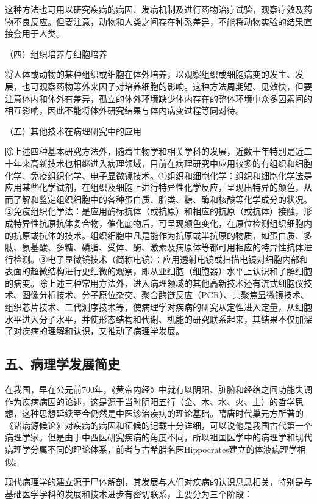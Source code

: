 这种方法也可用以研究疾病的病因、发病机制及进行药物治疗试验，观察疗效及药物不良反应。但要注意，动物和人类之间存在种系差异，不能将动物实验的结果直接套用于人类。

{（四）组织培养与细胞培养}

将人体或动物的某种组织或细胞在体外培养，以观察组织或细胞病变的发生、发展，也可观察药物等外来因子对培养细胞的影响。这种方法周期短、见效快，但要注意体内和体外有差异，孤立的体外环境缺少体内存在的整体环境中众多因素间的相互影响，因此不能将体外研究结果与体内病变过程等同对待。

{（五）其他技术在病理研究中的应用}

除上述四种基本研究方法外，随着生物学和相关学科的发展，近数十年特别是近二十年来高新技术也相继进入病理领域，目前在病理研究中应用较多的有组织和细胞化学、免疫组织化学、电子显微镜技术。①组织和细胞化学：组织和细胞化学法是应用某些化学试剂，在组织及细胞上进行特异性化学反应，呈现出特异的颜色，从而了解和鉴定组织细胞中的各种蛋白质、脂类、糖、酶和核酸等化学成分的状况。②免疫组织化学法：是应用酶标抗体（或抗原）和相应的抗原（或抗体）接触，形成特异性抗原抗体复合物，催化底物后，可呈现颜色变化，在原位检测组织细胞内的抗原或抗体的技术。组织细胞中凡是能作为抗原或半抗原的物质，如蛋白质、多肽、氨基酸、多糖、磷脂、受体、酶、激素及病原体等都可用相应的特异性抗体进行检测。③电子显微镜技术（简称电镜）：应用透射电镜或扫描电镜对细胞内部和表面的超微结构进行更细微的观察，即从亚细胞（细胞器）水平上认识和了解细胞的病变。除上述三种常用方法外，进入病理领域的其他高新技术还有流式细胞仪技术、图像分析技术、分子原位杂交、聚合酶链反应（PCR）、共聚焦显微镜技术、组织芯片技术、二代测序技术等，使病理学对疾病的研究从定性进入定量，从细胞水平进入分子水平，并使形态结构和代谢、机能的研究联系起来，其结果不仅加深了对疾病的理解和认识，又推动了病理学发展。

\subsection*{五、病理学发展简史}

在我国，早在公元前700年，《黄帝内经》中就有以阴阳、脏腑和经络之间功能失调作为疾病病因的论述，这是源于当时阴阳五行（金、木、水、火、土）的哲学思想，这种思想延续至今仍然是中医诊治疾病的理论基础。隋唐时代巢元方所著的《诸病源候论》对疾病的病因和征候的记载十分详细，可以说他是我国古代第一个病理学家。但是由于中西医研究疾病的角度不同，所以祖国医学中的病理学和现代病理学分属不同的理论体系，前者与古希腊名医Hippocrates建立的体液病理学相似。

现代病理学的建立源于尸体解剖，其发展与人们对疾病的认识息息相关，特别是与基础医学学科的发展和技术进步有密切联系，主要分为三个阶段：

